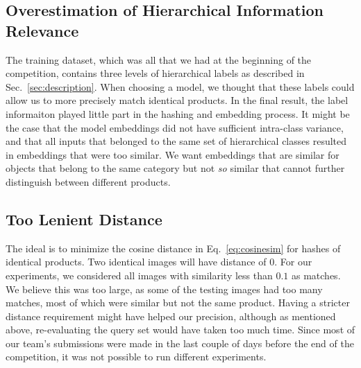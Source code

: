 \documentclass[conference]{IEEEtran}
\begin{document}
\subsection{Overestimation of Hierarchical Information Relevance}
The training dataset, which was all that we had at the beginning of the competition,
contains three levels of hierarchical labels as described in Sec.~\ref{sec:description}.
When choosing a model, we thought that these labels could allow us to more precisely match
identical products.
In the final result, the label informaiton played little part in the hashing and embedding process.
It might be the case that the model embeddings did not have sufficient intra-class variance, 
and that all inputs that belonged to the same set of hierarchical classes resulted in embeddings that were too 
similar.
We want embeddings that are similar for objects that belong to the same category but not
\emph{so} similar that cannot further distinguish between different products.

\subsection{Too Lenient Distance}
The ideal is to minimize the cosine distance in Eq.~\ref{eq:cosinesim} for 
hashes of identical products.
Two identical images will have distance of $0$.
For our experiments, we considered all images with similarity less than 
$0.1$ as matches.
We believe this was too large, as some of the testing images had too many matches,
most of which were similar but not the same product.
Having a stricter distance requirement might have helped our precision, although as 
mentioned above, re-evaluating the query set would have taken too much time.
Since most of our team's submissions were made in the last couple of days before the 
end of the competition, it was not possible to run different experiments.
\end{document}
